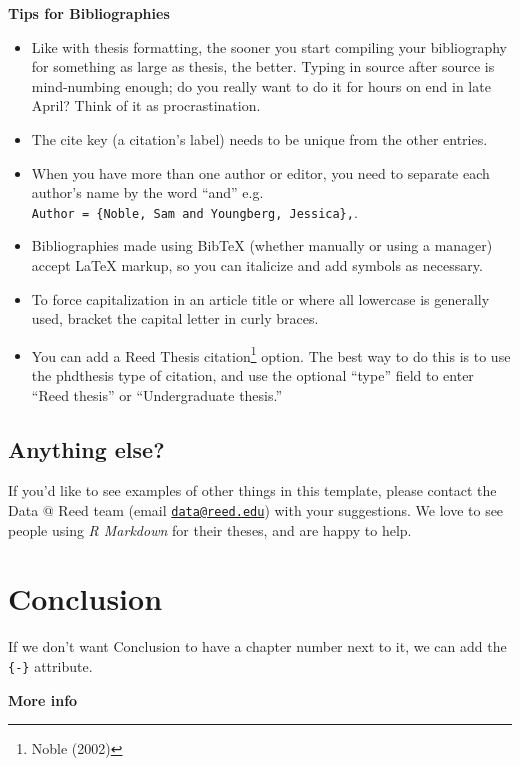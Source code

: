 \documentclass[12pt,twoside]{reedthesis}
\providecommand{\tightlist}{%
  \setlength{\itemsep}{0pt}\setlength{\parskip}{0pt}}
\begin{document}
\vfill

\textbf{Tips for Bibliographies}
\begin{itemize}
\tightlist
\item
  Like with thesis formatting, the sooner you start compiling your bibliography for something as large as thesis, the better. Typing in source after source is mind-numbing enough; do you really want to do it for hours on end in late April? Think of it as procrastination.
\item
  The cite key (a citation's label) needs to be unique from the other entries.
\item
  When you have more than one author or editor, you need to separate each author's name by the word ``and'' e.g. \texttt{Author\ =\ \{Noble,\ Sam\ and\ Youngberg,\ Jessica\},}.
\item
  Bibliographies made using BibTeX (whether manually or using a manager) accept LaTeX markup, so you can italicize and add symbols as necessary.
\item
  To force capitalization in an article title or where all lowercase is generally used, bracket the capital letter in curly braces.
\item
  You can add a Reed Thesis citation\footnote{Noble (2002)} option. The best way to do this is to use the phdthesis type of citation, and use the optional ``type'' field to enter ``Reed thesis'' or ``Undergraduate thesis.''
\end{itemize}
\hypertarget{anything-else}{%
\section{Anything else?}\label{anything-else}}

If you'd like to see examples of other things in this template, please contact the Data @ Reed team (email \href{mailto:data@reed.edu}{\nolinkurl{data@reed.edu}}) with your suggestions. We love to see people using \emph{R Markdown} for their theses, and are happy to help.

\hypertarget{conclusion}{%
\chapter*{Conclusion}\label{conclusion}}

If we don't want Conclusion to have a chapter number next to it, we can add the \texttt{\{-\}} attribute.

\textbf{More info}
\end{document}
